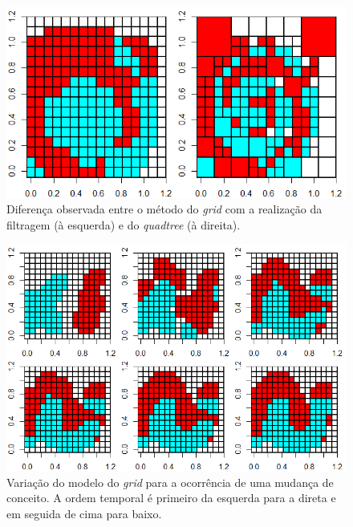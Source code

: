 \documentclass[conference]{IEEEtran}
\begin{document}
\begin{figure}[h]
\centerline{\includegraphics[width=0.7\columnwidth]{fig/off_filt.png}}
\caption{Diferença observada entre o método do \textit{grid} com a realização da filtragem (à esquerda) e do \textit{quadtree} (à direita).}
\label{offfilt}
\end{figure}

\begin{figure}[h]
\centerline{\includegraphics[width=1\columnwidth]{fig/drift_gmodel.png}}
\caption{Variação do modelo do \textit{grid} para a ocorrência de uma mudança de conceito. A ordem temporal é primeiro da esquerda para a direta e em seguida de cima para baixo.}
\label{driftgmodel}
\end{figure}
\end{document}
